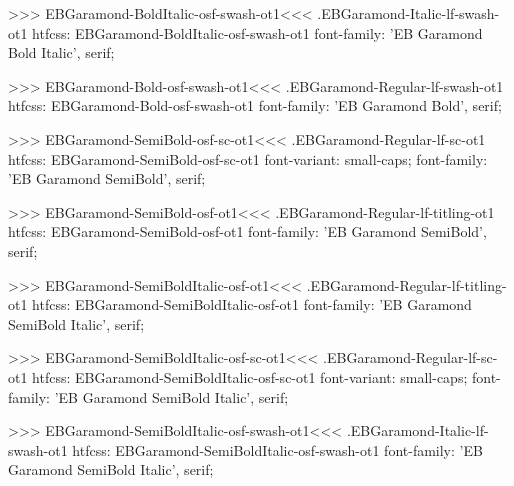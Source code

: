 {{{{{{{>>>
\<EBGaramond-BoldItalic-osf-swash-ot1\><<<
.EBGaramond-Italic-lf-swash-ot1
htfcss:  EBGaramond-BoldItalic-osf-swash-ot1  font-family: 'EB Garamond Bold Italic', serif;

>>>
\<EBGaramond-Bold-osf-swash-ot1\><<<
.EBGaramond-Regular-lf-swash-ot1
htfcss:  EBGaramond-Bold-osf-swash-ot1  font-family: 'EB Garamond Bold', serif;

>>>
\<EBGaramond-SemiBold-osf-sc-ot1\><<<
.EBGaramond-Regular-lf-sc-ot1
htfcss:  EBGaramond-SemiBold-osf-sc-ot1  font-variant: small-caps; font-family: 'EB Garamond SemiBold', serif;

>>>
\<EBGaramond-SemiBold-osf-ot1\><<<
.EBGaramond-Regular-lf-titling-ot1
htfcss:  EBGaramond-SemiBold-osf-ot1  font-family: 'EB Garamond SemiBold', serif;

>>>
\<EBGaramond-SemiBoldItalic-osf-ot1\><<<
.EBGaramond-Regular-lf-titling-ot1
htfcss:  EBGaramond-SemiBoldItalic-osf-ot1  font-family: 'EB Garamond SemiBold Italic', serif;

>>>
\<EBGaramond-SemiBoldItalic-osf-sc-ot1\><<<
.EBGaramond-Regular-lf-sc-ot1
htfcss:  EBGaramond-SemiBoldItalic-osf-sc-ot1  font-variant: small-caps; font-family: 'EB Garamond SemiBold Italic', serif;

>>>
\<EBGaramond-SemiBoldItalic-osf-swash-ot1\><<<
.EBGaramond-Italic-lf-swash-ot1
htfcss:  EBGaramond-SemiBoldItalic-osf-swash-ot1  font-family: 'EB Garamond SemiBold Italic', serif;

}}}}}}}
